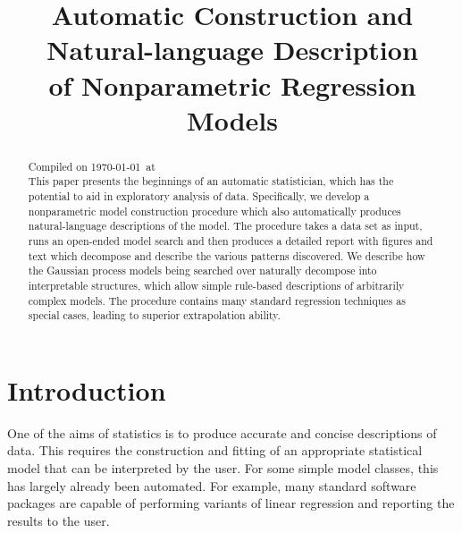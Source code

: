 \documentclass[letterpaper]{article}
\begin{document}
%
\title{Automatic Construction and Natural-language Description \\ of Nonparametric Regression Models}
\author{}
\maketitle






\begin{abstract} 
Compiled on \today\ at \currenttime
\\
This paper presents the beginnings of an automatic statistician, which has the potential to aid in exploratory analysis of data.
Specifically, we develop a nonparametric model construction procedure which also automatically produces natural-language descriptions of the model.
The procedure takes a data set as input, runs an open-ended model search and then produces a detailed report with figures and text which decompose and describe the various patterns discovered.
We describe how the Gaussian process models being searched over naturally decompose into interpretable structures, which allow simple rule-based descriptions of arbitrarily complex models.
The procedure contains many standard regression techniques as special cases, leading to superior extrapolation ability.
\end{abstract} 


\section{Introduction}
One of the aims of statistics is to produce accurate and concise descriptions of data.
This requires the construction and fitting of an appropriate statistical model that can be interpreted by the user.
For some simple model classes, this has largely already been automated.
For example, many standard software packages are capable of performing variants of linear regression and reporting the results to the user. 
\end{document}
